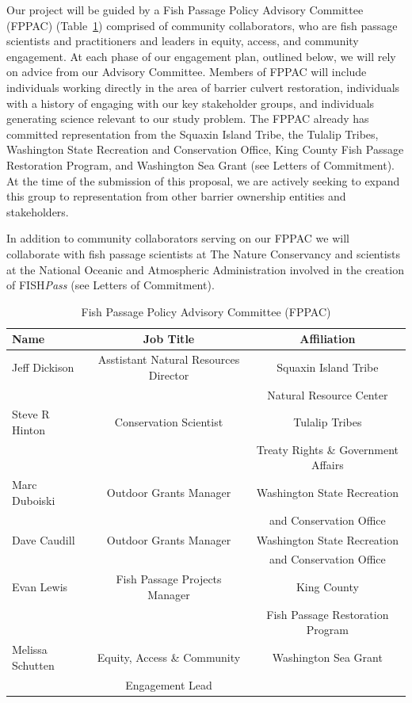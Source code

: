\documentclass[12pt]{elsarticle}
\begin{document}
Our project will be guided by a Fish Passage Policy Advisory Committee (FPPAC) (Table~\ref{tab:sab}) comprised of community collaborators, who are fish passage scientists and practitioners and leaders in equity, access, and community engagement. At each phase of our engagement plan, outlined below, we will rely on advice from our Advisory Committee. Members of FPPAC will include individuals working directly in the area of barrier culvert restoration, individuals with a history of engaging with our key stakeholder groups, and individuals generating science relevant to our study problem. The FPPAC already has committed representation from the Squaxin Island Tribe, the Tulalip Tribes, Washington State Recreation and Conservation Office, King County Fish Passage Restoration Program, and Washington Sea Grant (see Letters of Commitment). At the time of the submission of this proposal, we are actively seeking to expand this group to representation from other barrier ownership entities and stakeholders. 

In addition to community collaborators serving on our FPPAC we will collaborate with fish passage scientists at The Nature Conservancy and scientists at the National Oceanic and Atmospheric Administration involved in the creation of FISH\emph{Pass} (see Letters of Commitment).

\begin{table}[h]
\caption{Fish Passage Policy Advisory Committee (FPPAC) \label{tab:sab}}
\centering
\begin{tabular}{lcc}\hline
 Name & Job Title & Affiliation  \\\hline
Jeff Dickison& Asstistant Natural Resources Director &  Squaxin Island Tribe\\
& & Natural Resource Center\\
\rowcolor[gray]{.9} Steve R Hinton &  Conservation Scientist&  Tulalip Tribes  \\
\rowcolor[gray]{.9}& &Treaty Rights \& Government Affairs\\
Marc Duboiski & Outdoor Grants Manager & Washington State Recreation\\
& & and Conservation Office\\
\rowcolor[gray]{.9}Dave Caudill & Outdoor Grants Manager & Washington State Recreation\\
\rowcolor[gray]{.9}& & and Conservation Office\\
Evan Lewis &  Fish Passage Projects Manager&  King County  \\
& & Fish Passage Restoration Program\\
\rowcolor[gray]{.9}Melissa Schutten & Equity, Access \& Community  & Washington Sea Grant \\
\rowcolor[gray]{.9}& Engagement Lead & \\
\hline
\end{tabular}
\end{table}
\end{document}
